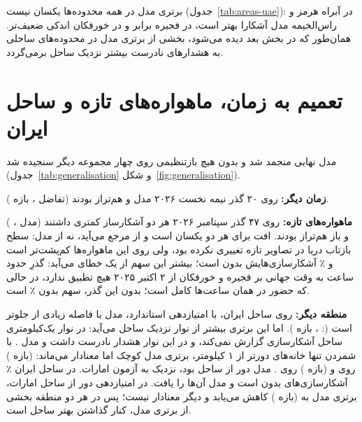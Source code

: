 برتری مدل در همه محدوده‌ها یکسان نیست (جدول~\ref{tab:areas-uae}): در آبراه هرمز و
راس‌الخیمه مدل آشکارا بهتر است، در فجیره برابر و در خورفکان اندکی ضعیف‌تر. همان‌طور که در
بخش بعد دیده می‌شود، بخشی از برتری مدل در محدوده‌های ساحلی به هشدارهای نادرست بیشتر
 نزدیک ساحل برمی‌گردد.



\section{تعمیم به زمان، ماهواره‌های تازه و ساحل ایران}
مدل نهایی منجمد شد و بدون هیچ بازتنظیمی روی چهار مجموعه دیگر سنجیده شد
(جدول~\ref{tab:generalisation} و شکل~\ref{fig:generalisation}).

\textbf{زمان دیگر:} روی ۲۰ گذر  نیمه نخست ۲۰۲۶ مدل و  هم‌تراز بودند
(تفاضل \genUaeEarlyStdDiff{}، بازه \genUaeEarlyStdCi).

\textbf{ماهواره‌های تازه:} روی ۴۷ گذر  سپتامبر ۲۰۲۶ هر دو آشکارساز
 کمتری داشتند (مدل \genUaeNewStdModel{}،  \genUaeNewStdCfar) و باز هم‌تراز
بودند. افت برای هر دو یکسان است و از مرجع می‌آید، نه از مدل: سطح بازتاب دریا در تصاویر تازه
تغییری نکرده بود، ولی  روی این ماهواره‌ها کم‌پشت‌تر است و ٪ آشکارسازی‌هایش
بدون  است؛ بیشتر این سهم از یک خطای  می‌آید: گذرِ حدود ساعت  به وقت
جهانی بر فجیره و خورفکان از ۲ اکتبر ۲۰۲۵ هیچ تطبیق  ندارد، در حالی که حضور 
در همان ساعت‌ها کامل است؛ بدون این گذر، سهم بدون  ٪ است.



\textbf{منطقه دیگر:} روی ساحل ایران، با امتیازدهی استاندارد، مدل با فاصله زیادی از
 جلوتر است (: \genIranTestStdDiff{}، بازه \genIranTestStdCi). اما این برتری
بیشتر از نوار نزدیک ساحل می‌آید:  در نوار یک‌کیلومتری ساحل آشکارسازی گزارش نمی‌کند، و
در این نوار   هشدار نادرست داشت و مدل . با شمردن تنها خانه‌های
دورتر از ۱ کیلومتر، برتری مدل کوچک اما معنادار می‌ماند: \genIranTestFarDiff{} (بازه
\genIranTestFarCi) روی  و \genIranNewFarDiff{} (بازه \genIranNewFarCi) روی
.  مدل دور از ساحل \genIranTestFarModel{} بود، نزدیک به \genUaeTestStdModel{}
آزمون امارات. در ساحل ایران ٪ آشکارسازی‌های  بدون  است و مدل
 آن‌ها را یافت. در امتیازدهی دور از ساحل امارات، برتری مدل به \genUaeTestFarDiff{}
(بازه \genUaeTestFarCi) کاهش می‌یابد و دیگر معنادار نیست؛ پس در هر دو منطقه بخشی از برتری مدل، کنار گذاشتن
بهتر ساحل است.

